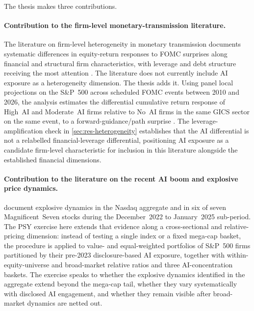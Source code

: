 The thesis makes three contributions.

\paragraph{Contribution to the firm-level monetary-transmission
literature.} The literature on firm-level heterogeneity in monetary
transmission documents systematic differences in equity-return
responses to FOMC surprises along financial and structural firm
characteristics, with leverage and debt structure receiving the most
attention \citep{ottonelloWinberry2020, gurkaynakKarasoyCanLee2022,
cloyneEtAl2023, arinEtAl2025}. The literature does not currently
include AI exposure as a heterogeneity dimension. The thesis adds it.
Using panel local projections on the S\&P~500 across scheduled FOMC
events between 2010 and 2026, the analysis estimates the differential
cumulative return response of High~AI and Moderate~AI firms relative
to No~AI firms in the same GICS sector on the same event, to a
forward-guidance/path surprise \citep{swanson2021}. The
leverage-amplification check in \cref{sec:res-heterogeneity}
establishes that the AI differential is not a relabelled
financial-leverage differential, positioning AI exposure as a
candidate firm-level characteristic for inclusion in this literature
alongside the established financial dimensions.

\paragraph{Contribution to the literature on the recent AI boom and
explosive price dynamics.}  document
explosive dynamics in the Nasdaq aggregate and in six of seven
Magnificent~Seven stocks during the December~2022 to January~2025
sub-period. The PSY exercise here extends that evidence along a
cross-sectional and relative-pricing dimension: instead of testing a
single index or a fixed mega-cap basket, the procedure is applied to
value- and equal-weighted portfolios of S\&P~500 firms partitioned
by their pre-2023 disclosure-based AI exposure, together with
within-equity-universe and broad-market relative ratios and three
AI-concentration baskets. The exercise speaks to whether the
explosive dynamics identified in the aggregate extend beyond the
mega-cap tail, whether they vary systematically with disclosed AI
engagement, and whether they remain visible after broad-market
dynamics are netted out.

